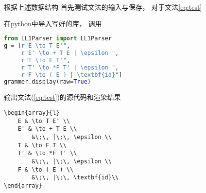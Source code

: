 \documentclass[../report]{subfiles}
\begin{document}
根据上述数据结构
首先测试文法的输入与保存，
对于文法\ref{eq:test}

在python中导入写好的库，
调用
\begin{lstlisting}[language=python]
from LL1Parser import LL1Parser
g = [r"E \to T E'",
     r"E' \to + T E | \epsilon ",
     r"T \to F T'",
     r"T' \to *F T' | \epsilon ",
     r"F \to ( E ) | \textbf{id}"]
grammer.display(raw=True)
\end{lstlisting}

输出文法(\ref{eq:test})的源代码和渲染结果
\begin{lstlisting}
\begin{array}{l}
	E & \to T E' \\
	E' & \to + T E \\
		&\;\, |\;\, \epsilon \\
	T & \to F T \\
	T' & \to *F T' \\
		&\;\, |\;\, \epsilon \\
	F & \to ( E ) \\
		&\;\, |\;\, \textbf{id}\\
\end{array}
\end{lstlisting}
\end{document}
